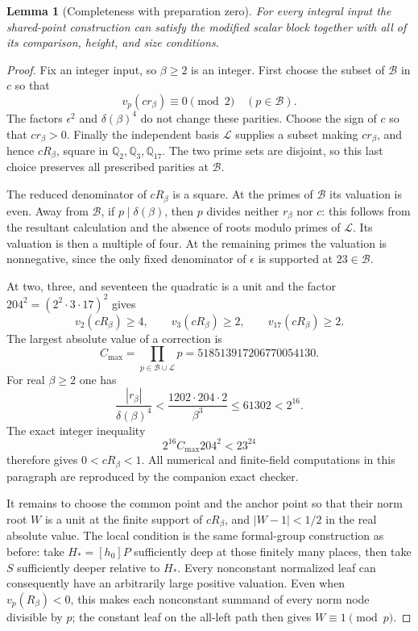 \documentclass[11pt]{article}
\newtheorem{lemma}[theorem]{Lemma}
\theoremstyle{definition}
\begin{document}
\begin{lemma}[Completeness with preparation zero]
\label{lem:normalized-scalar-completeness}
For every integral input the shared-point construction can satisfy
the modified scalar block together with all of its comparison,
height, and size conditions.
\end{lemma}
\begin{proof}
Fix an integer input, so $\beta\ge2$ is an integer.  First choose
the subset of $\mathcal B$ in $c$ so that
\[
               v_p(cr_\beta)\equiv0\pmod2\quad(p\in\mathcal B).
\]
The factors $\epsilon^2$ and $\delta(\beta)^4$ do not change these
parities.  Choose the sign of $c$ so that $cr_\beta>0$.  Finally
the independent basis $\mathcal L$ supplies a subset making
$cr_\beta$, and hence $cR_\beta$, square in
$\mathbb Q_2,\mathbb Q_3,\mathbb Q_{17}$.  The two prime sets
are disjoint, so this last choice preserves all prescribed parities
at $\mathcal B$.

The reduced denominator of $cR_\beta$ is a square.  At the primes
of $\mathcal B$ its valuation is even.  Away from $\mathcal B$,
if $p\mid\delta(\beta)$, then $p$ divides neither $r_\beta$ nor
$c$: this follows from the resultant calculation and the absence
of roots modulo primes of $\mathcal L$.  Its valuation is then a
multiple of four.  At the remaining primes the valuation is
nonnegative, since the only fixed denominator of $\epsilon$ is
supported at $23\in\mathcal B$.

At two, three, and seventeen the quadratic is a unit and
the factor $204^2=(2^2\cdot3\cdot17)^2$ gives
\[
 v_2(cR_\beta)\ge4,\qquad
 v_3(cR_\beta)\ge2,\qquad
 v_{17}(cR_\beta)\ge2.
\]
The largest absolute value of a correction is
\[
 C_{\max}=\prod_{p\in\mathcal B\cup\mathcal L}p
          =518513917206770054130.
\]
For real $\beta\ge2$ one has
\[
 \frac{|r_\beta|}{\delta(\beta)^4}
 <\frac{1202\cdot204\cdot2}{\beta^3}
 \le61302<2^{16}.
\]
The exact integer inequality
\[
              2^{16}C_{\max}204^2<23^{24}
\]
therefore gives $0<cR_\beta<1$.  All numerical and finite-field
computations in this paragraph are reproduced by the companion
exact checker.

It remains to choose the common point and the anchor point so
that their norm root $W$ is a unit at the finite support of
$cR_\beta$, and $|W-1|<1/2$ in the real absolute value.  The local
condition is the same formal-group construction as before: take
$H_*=[h_0]P$ sufficiently deep at those finitely many places,
then take $S$ sufficiently deeper relative to $H_*$.  Every
nonconstant normalized leaf can consequently have an arbitrarily
large positive valuation.  Even when $v_p(R_\beta)<0$, this makes
each nonconstant summand of every norm node divisible by $p$;
the constant leaf on the all-left path then gives $W\equiv1\pmod p$.


\end{proof}
\end{document}
